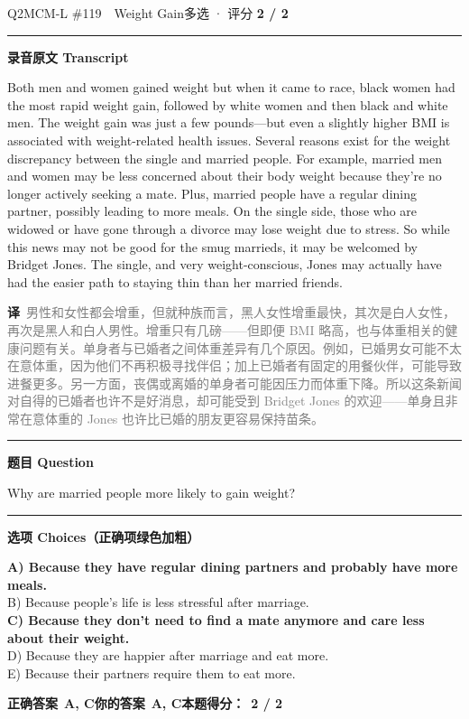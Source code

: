 \documentclass[11pt]{article}
\newcommand{\ptesub}[1]{%
  \par\needspace{2\baselineskip}\smallskip
  {\color{cAccent}\rule[-0.2ex]{3pt}{1.05em}}\hspace{6pt}%
  {\bfseries\color{cHead}#1}\par\nopagebreak\smallskip}
\newcommand{\zh}[1]{{\footnotesize\textcolor{cNote}{\textbf{译}}\ \textcolor{gray}{#1}}}
\begin{document}
\begin{qblock}{Q2\quad MCM-L \#119\ \ Weight Gain}{多选 · 评分 \textcolor{cAccent}{\bfseries 2 / 2}}
\ptesub{录音原文 Transcript}
\begin{promptbox}
Both men and women gained weight but when it came to race, black women had the most rapid weight gain, followed by white women and then black and white men. The weight gain was just a few pounds---but even a slightly higher BMI is associated with weight-related health issues. Several reasons exist for the weight discrepancy between the single and married people. For example, married men and women may be less concerned about their body weight because they're no longer actively seeking a mate. Plus, married people have a regular dining partner, possibly leading to more meals. On the single side, those who are widowed or have gone through a divorce may lose weight due to stress. So while this news may not be good for the smug marrieds, it may be welcomed by Bridget Jones. The single, and very weight-conscious, Jones may actually have had the easier path to staying thin than her married friends.
\end{promptbox}
\zh{男性和女性都会增重，但就种族而言，黑人女性增重最快，其次是白人女性，再次是黑人和白人男性。增重只有几磅——但即便 BMI 略高，也与体重相关的健康问题有关。单身者与已婚者之间体重差异有几个原因。例如，已婚男女可能不太在意体重，因为他们不再积极寻找伴侣；加上已婚者有固定的用餐伙伴，可能导致进餐更多。另一方面，丧偶或离婚的单身者可能因压力而体重下降。所以这条新闻对自得的已婚者也许不是好消息，却可能受到 Bridget Jones 的欢迎——单身且非常在意体重的 Jones 也许比已婚的朋友更容易保持苗条。}
\ptesub{题目 Question}
\begin{notebox}Why are married people more likely to gain weight?\end{notebox}
\ptesub{选项 Choices（正确项绿色加粗）}
{\small
{\color{cFix}\textbf{A) Because they have regular dining partners and probably have more meals.}}\\
B) Because people's life is less stressful after marriage.\\
{\color{cFix}\textbf{C) Because they don't need to find a mate anymore and care less about their weight.}}\\
D) Because they are happier after marriage and eat more.\\
E) Because their partners require them to eat more.}
\par\smallskip
\textbf{正确答案}\ \textcolor{cFix}{\bfseries A, C}\qquad\textbf{你的答案}\ \textcolor{cFix}{\bfseries A, C}\qquad\textbf{本题得分：}\ {\color{cAccent}\bfseries 2 / 2}
\end{qblock}
\end{document}
